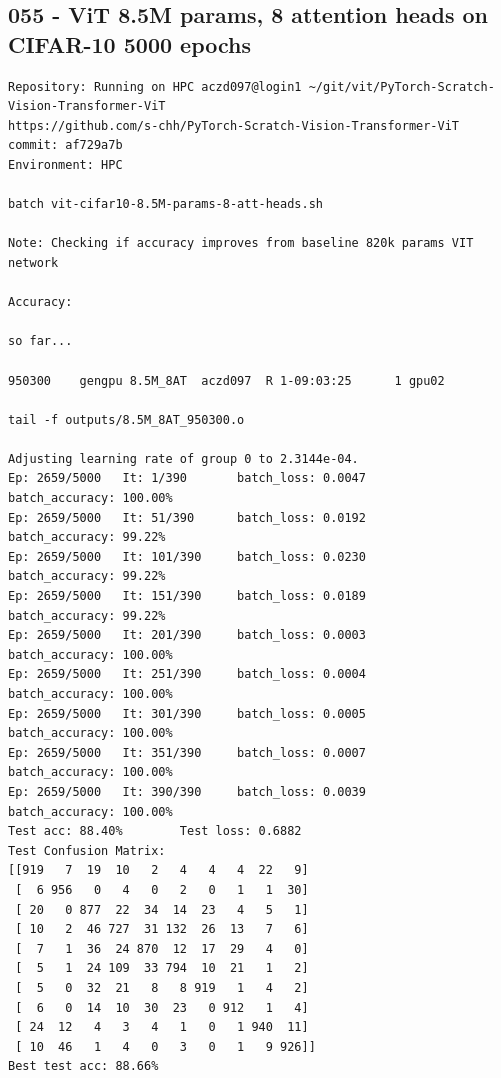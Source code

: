 \subsection{055 - ViT 8.5M params, 8 attention heads on CIFAR-10 5000 epochs}
\label{app_res:055}
\begin{verbatim}
Repository: Running on HPC aczd097@login1 ~/git/vit/PyTorch-Scratch-Vision-Transformer-ViT
https://github.com/s-chh/PyTorch-Scratch-Vision-Transformer-ViT
commit: af729a7b
Environment: HPC

batch vit-cifar10-8.5M-params-8-att-heads.sh

Note: Checking if accuracy improves from baseline 820k params VIT network

Accuracy: 

so far...

950300    gengpu 8.5M_8AT  aczd097  R 1-09:03:25      1 gpu02

tail -f outputs/8.5M_8AT_950300.o

Adjusting learning rate of group 0 to 2.3144e-04.
Ep: 2659/5000   It: 1/390       batch_loss: 0.0047      batch_accuracy: 100.00%
Ep: 2659/5000   It: 51/390      batch_loss: 0.0192      batch_accuracy: 99.22%
Ep: 2659/5000   It: 101/390     batch_loss: 0.0230      batch_accuracy: 99.22%
Ep: 2659/5000   It: 151/390     batch_loss: 0.0189      batch_accuracy: 99.22%
Ep: 2659/5000   It: 201/390     batch_loss: 0.0003      batch_accuracy: 100.00%
Ep: 2659/5000   It: 251/390     batch_loss: 0.0004      batch_accuracy: 100.00%
Ep: 2659/5000   It: 301/390     batch_loss: 0.0005      batch_accuracy: 100.00%
Ep: 2659/5000   It: 351/390     batch_loss: 0.0007      batch_accuracy: 100.00%
Ep: 2659/5000   It: 390/390     batch_loss: 0.0039      batch_accuracy: 100.00%
Test acc: 88.40%        Test loss: 0.6882
Test Confusion Matrix:
[[919   7  19  10   2   4   4   4  22   9]
 [  6 956   0   4   0   2   0   1   1  30]
 [ 20   0 877  22  34  14  23   4   5   1]
 [ 10   2  46 727  31 132  26  13   7   6]
 [  7   1  36  24 870  12  17  29   4   0]
 [  5   1  24 109  33 794  10  21   1   2]
 [  5   0  32  21   8   8 919   1   4   2]
 [  6   0  14  10  30  23   0 912   1   4]
 [ 24  12   4   3   4   1   0   1 940  11]
 [ 10  46   1   4   0   3   0   1   9 926]]
Best test acc: 88.66%

\end{verbatim}

